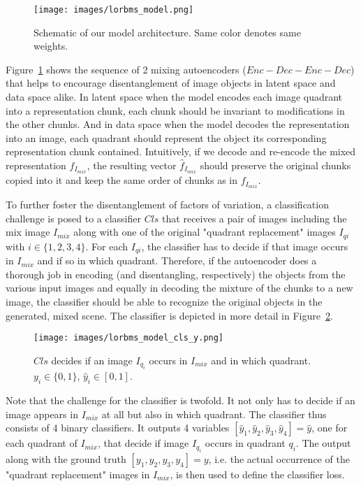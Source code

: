 \documentclass[a4paper,12pt]{report}
\begin{document}
\begin{figure}[ht]
\centering
\texttt{[image: images/lorbms\_model.png]}
\caption{Schematic of our model architecture. Same color denotes same weights.}
\label{fig:model_arch}
\end{figure}

Figure~\ref{fig:model_arch} shows the sequence of 2 mixing autoencoders ($Enc-Dec-Enc-Dec$) that helps to encourage disentanglement of image objects in latent space and data space alike. In latent space when the model encodes each image quadrant into a representation chunk, each chunk should be invariant to modifications in the other chunks. And in data space when the model decodes the representation into an image, each quadrant should represent the object its corresponding representation chunk contained. Intuitively, if we decode and re-encode the mixed representation $f_{I_{mix}}$, the resulting vector $\hat{f}_{I_{mix}}$ should preserve the original chunks copied into it and keep the same order of chunks as in $f_{I_{mix}}$.

To further foster the disentanglement of factors of variation, a classification challenge is posed to a classifier $Cls$ that receives a pair of images including the mix image $I_{mix}$ along with one of the original "quadrant replacement" images $I_{qi}$ with $i \in \{1,2,3,4\}$. For each $I_{qi}$, the classifier has to decide if that image occurs in $I_{mix}$ and if so in which quadrant. Therefore, if the autoencoder does a thorough job in encoding (and disentangling, respectively) the objects from the various input images and equally in decoding the mixture of the chunks to a new image, the classifier should be able to recognize the original objects in the generated, mixed scene. The classifier is depicted in more detail in Figure~\ref{fig:model_cls}.
\begin{figure}[ht]
\centering
\texttt{[image: images/lorbms\_model\_cls\_y.png]}
\caption{$Cls$ decides if an image $I_{q_i}$ occurs in $I_{mix}$ and in which quadrant. $y_i \in \{0,1\}$, $\hat{y}_i \in [0,1]$.}
\label{fig:model_cls}
\end{figure}
Note that the challenge for the classifier is twofold. It not only has to decide if an image appears in $I_{mix}$ at all but also in which quadrant. The classifier thus consists of 4 binary classifiers. It outputs 4 variables $[\hat{y}_1,\hat{y}_2,\hat{y}_3,\hat{y}_4] = \hat{y}$, one for each quadrant of $I_{mix}$, that decide if image $I_{q_i}$ occurs in quadrant $q_i$. The output along with the ground truth $[y_1,y_2,y_3,y_4] = y$, i.e. the actual occurrence of the "quadrant replacement" images in $I_{mix}$, is then used to define the classifier loss. 
\end{document}
